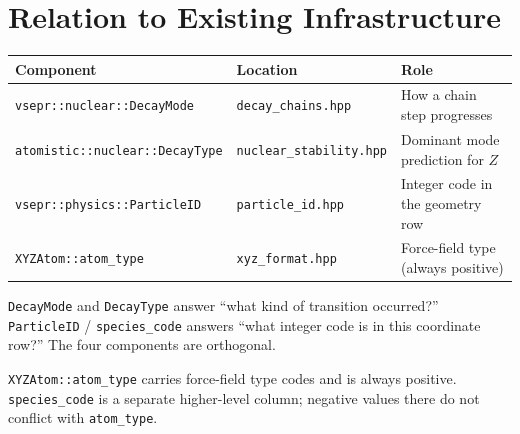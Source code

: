 \documentclass[11pt,a4paper]{article}
\begin{document}
\section{Relation to Existing Infrastructure}

\begin{center}
\begin{tabular}{lll}
\toprule
\textbf{Component} & \textbf{Location} & \textbf{Role} \\
\midrule
\texttt{vsepr::nuclear::DecayMode}       & \texttt{decay\_chains.hpp}      & How a chain step progresses \\
\texttt{atomistic::nuclear::DecayType}   & \texttt{nuclear\_stability.hpp} & Dominant mode prediction for $Z$ \\
\texttt{vsepr::physics::ParticleID}      & \texttt{particle\_id.hpp}       & Integer code in the geometry row \\
\texttt{XYZAtom::atom\_type}             & \texttt{xyz\_format.hpp}        & Force-field type (always positive) \\
\bottomrule
\end{tabular}
\end{center}

\texttt{DecayMode} and \texttt{DecayType} answer ``what kind of
transition occurred?''  \texttt{ParticleID} / \texttt{species\_code}
answers ``what integer code is in this coordinate row?''
The four components are orthogonal.

\texttt{XYZAtom::atom\_type} carries force-field type codes and is
always positive.  \texttt{species\_code} is a separate higher-level
column; negative values there do not conflict with \texttt{atom\_type}.
\end{document}
